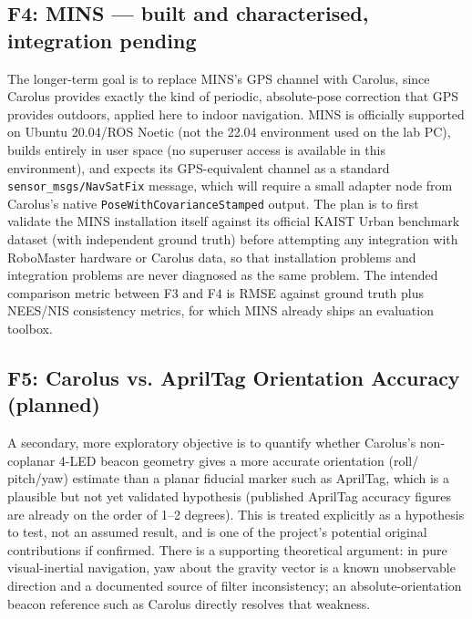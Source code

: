 \documentclass[11pt]{article}
\begin{document}
\subsection{F4: MINS --- built and characterised, integration pending}
The longer-term goal is to replace MINS's GPS channel with Carolus, since
Carolus provides exactly the kind of periodic, absolute-pose correction that
GPS provides outdoors, applied here to indoor navigation. MINS is officially
supported on Ubuntu 20.04/ROS Noetic (not the 22.04 environment used on the
lab PC), builds entirely in user space (no superuser access is available in
this environment), and expects its GPS-equivalent channel as a standard
\texttt{sensor\_msgs/NavSatFix} message, which will require a small adapter
node from Carolus's native \texttt{PoseWithCovarianceStamped} output. The
plan is to first validate the MINS installation itself against its official
KAIST Urban benchmark dataset (with independent ground truth) before
attempting any integration with RoboMaster hardware or Carolus data,
so that installation problems and integration problems are never diagnosed
as the same problem. The intended comparison metric between F3 and F4 is
RMSE against ground truth plus NEES/NIS consistency metrics, for which MINS
already ships an evaluation toolbox.

\subsection{F5: Carolus vs. AprilTag Orientation Accuracy (planned)}
A secondary, more exploratory objective is to quantify whether Carolus's
non-coplanar 4-LED beacon geometry gives a more accurate orientation (roll/
pitch/yaw) estimate than a planar fiducial marker such as AprilTag, which is
a plausible but not yet validated hypothesis (published AprilTag accuracy
figures are already on the order of 1--2 degrees). This is treated
explicitly as a hypothesis to test, not an assumed result, and is one of the
project's potential original contributions if confirmed. There is a
supporting theoretical argument: in pure visual-inertial navigation, yaw
about the gravity vector is a known unobservable direction and a documented
source of filter inconsistency; an absolute-orientation beacon reference
such as Carolus directly resolves that weakness.
\end{document}

